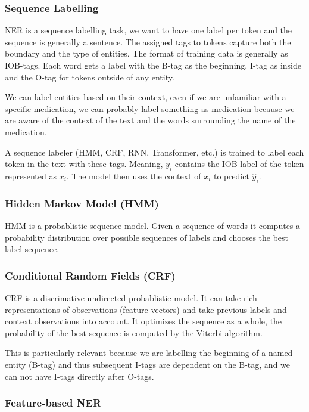\subsubsection{Sequence Labelling}

NER is a sequence labelling task, we want to have one label per token and
the sequence is generally a sentence. The assigned tags to tokens capture
both the boundary and the type of entities.
The format of training data is generally as IOB-tags. Each word gets a label
with the B-tag as the beginning, I-tag as inside and the O-tag for
tokens outside
of any entity.

We can label entities based on their context, even if we are unfamiliar with
a specific medication, we can probably label something as medication because
we are aware of the context of the text and the words surrounding the name of
the medication.

A sequence labeler (HMM, CRF, RNN, Transformer, etc.) is trained to label
each token in the text with these tags. Meaning, $y_i$ contains the IOB-label
of the token represented as $x_i$. The model then uses the context of $x_i$ to
predict $\hat{y}_i$.

\subsubsection{Hidden Markov Model (HMM)}

HMM is a probablistic sequence model. Given a sequence of words it
computes a probability distribution over possible sequences of labels
and chooses the best label sequence.

\subsubsection{Conditional Random Fields (CRF)}

CRF is a discrimative undirected probablistic model. It can take rich
representations
of observations (feature vectors) and take previous labels and
context observations into
account. It optimizes the sequence as a whole, the probability of the
best sequence is
computed by the Viterbi algorithm.

This is particularly relevant because we are labelling the beginning
of a named entity (B-tag) and thus subsequent I-tags are dependent on
the B-tag, and we can not have I-tags directly after O-tags.

\subsubsection{Feature-based NER}

